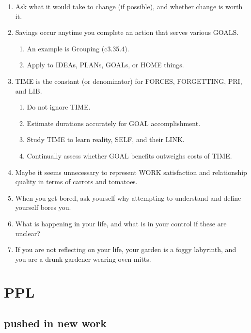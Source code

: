 \documentclass[
]{book}
\providecommand{\tightlist}{%
  \setlength{\itemsep}{0pt}\setlength{\parskip}{0pt}}
\begin{document}
\begin{enumerate}
\def\labelenumi{\arabic{enumi}.}
\setcounter{enumi}{35}
\tightlist
\item
  Ask what it would take to change (if possible), and whether change is worth it.
\item
  Savings occur anytime you complete an action that serves various GOALS.

  \begin{enumerate}
  \def\labelenumii{\arabic{enumii}.}
  \tightlist
  \item
    An example is Grouping (c3.35.4).\\
  \item
    Apply to IDEAs, PLANs, GOALs, or HOME things.
  \end{enumerate}
\item
  TIME is the constant (or denominator) for FORCES, FORGETTING, PRI, and LIB.

  \begin{enumerate}
  \def\labelenumii{\arabic{enumii}.}
  \tightlist
  \item
    Do not ignore TIME.
  \item
    Estimate durations accurately for GOAL accomplishment.
  \item
    Study TIME to learn reality, SELF, and their LINK.
  \item
    Continually assess whether GOAL benefits outweighs costs of TIME.
  \end{enumerate}
\item
  Maybe it seems unnecessary to represent WORK satisfaction and relationship
  quality in terms of carrots and tomatoes.
\item
  When you get bored, ask yourself why attempting to understand and define yourself bores you.
\item
  What is happening in your life, and what is in your control if these are unclear?
\item
  If you are not reflecting on your life, your garden is a foggy labyrinth, and you
  are a drunk gardener wearing oven-mitts.
\end{enumerate}

\hypertarget{ppl}{%
\chapter{PPL}\label{ppl}}

\hypertarget{pushed-in-new-work}{%
\section{pushed in new work}\label{pushed-in-new-work}}
\end{document}

